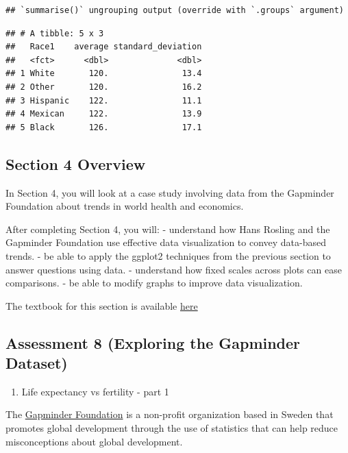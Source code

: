 \documentclass[
]{article}
\providecommand{\tightlist}{%
  \setlength{\itemsep}{0pt}\setlength{\parskip}{0pt}}
\begin{document}
\begin{verbatim}
## `summarise()` ungrouping output (override with `.groups` argument)
\end{verbatim}

\begin{verbatim}
## # A tibble: 5 x 3
##   Race1    average standard_deviation
##   <fct>      <dbl>              <dbl>
## 1 White       120.               13.4
## 2 Other       120.               16.2
## 3 Hispanic    122.               11.1
## 4 Mexican     122.               13.9
## 5 Black       126.               17.1
\end{verbatim}

\hypertarget{section-4-overview}{%
\subsection{Section 4 Overview}\label{section-4-overview}}

In Section 4, you will look at a case study involving data from the
Gapminder Foundation about trends in world health and economics.

After completing Section 4, you will: - understand how Hans Rosling and
the Gapminder Foundation use effective data visualization to convey
data-based trends. - be able to apply the ggplot2 techniques from the
previous section to answer questions using data. - understand how fixed
scales across plots can ease comparisons. - be able to modify graphs to
improve data visualization.

The textbook for this section is available
\href{https://rafalab.github.io/dsbook/gapminder.html\#case-study-new-insights-on-poverty}{here}

\hypertarget{assessment-8-exploring-the-gapminder-dataset}{%
\subsection{Assessment 8 (Exploring the Gapminder
Dataset)}\label{assessment-8-exploring-the-gapminder-dataset}}

\begin{enumerate}
\def\labelenumi{\arabic{enumi}.}
\tightlist
\item
  Life expectancy vs fertility - part 1
\end{enumerate}

The \href{https://www.gapminder.org/}{Gapminder Foundation} is a
non-profit organization based in Sweden that promotes global development
through the use of statistics that can help reduce misconceptions about
global development.
\end{document}
